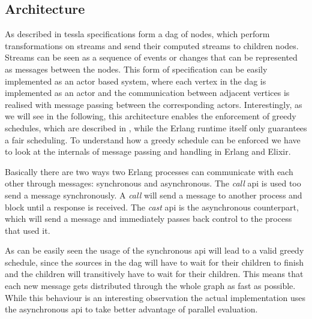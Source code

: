 \subsection{Architecture}
\label{sec:implementation:tesslaserver:architecture}

As described in  \gls{tessla} specifications form a \gls{dag} of nodes, which perform transformations on streams and send their computed streams to children nodes.
Streams can be seen as a sequence of events or changes that can be represented as messages between the nodes.
This form of specification can be easily implemented as an actor based system, where each vertex in the \gls{dag} is implemented as an actor and the communication between adjacent vertices is realised with message passing between the corresponding actors.
Interestingly, as we will see in the following, this architecture enables the enforcement of greedy schedules, which are described in , while the Erlang runtime itself only guarantees a fair scheduling.
To understand how a greedy schedule can be enforced we have to look at the internals of message passing and handling in Erlang and Elixir.

Basically there are two ways two Erlang processes can communicate with each other through messages: synchronous and asynchronous.
The \emph{call} \gls{api} is used too send a message synchronously.
A \emph{call} will send a message to another process and block until a response is received.
The \emph{cast} \gls{api} is the asynchronous counterpart, which will send a message and immediately passes back control to the process that used it.

As can be easily seen the usage of the synchronous \gls{api} will lead to a valid greedy schedule, since the sources in the \gls{dag} will have to wait for their children to finish and the children will transitively have to wait for their children.
This means that each new message gets distributed through the whole graph as fast as possible.
While this behaviour is an interesting observation the actual implementation uses the asynchronous \gls{api} to take better advantage of parallel evaluation.

